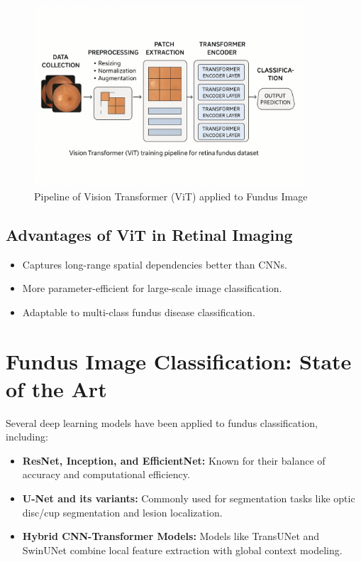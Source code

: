 \documentclass[a4paper,12pt]{report}
\begin{document}
\begin{figure}[H]
    \centering
    \includegraphics[width=0.9\textwidth]{vit_pipeline.png} 
    \caption{Pipeline of Vision Transformer (ViT) applied to Fundus Image}
    \label{fig:vit_pipeline}
\end{figure}

\subsection{Advantages of ViT in Retinal Imaging}
\begin{itemize}
    \item Captures long-range spatial dependencies better than CNNs.
    \item More parameter-efficient for large-scale image classification.
    \item Adaptable to multi-class fundus disease classification.
\end{itemize}


\section*{Fundus Image Classification: State of the Art}

Several deep learning models have been applied to fundus classification, including:
\begin{itemize}
    \item \textbf{ResNet, Inception, and EfficientNet:} Known for their balance of accuracy and computational efficiency.
    \item \textbf{U-Net and its variants:} Commonly used for segmentation tasks like optic disc/cup segmentation and lesion localization.
    \item \textbf{Hybrid CNN-Transformer Models:} Models like TransUNet and SwinUNet combine local feature extraction with global context modeling.
\end{itemize}
\end{document}

